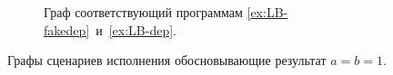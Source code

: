 {\begin{figure}[t]
\begin{subfigure}[b]{.55\textwidth}
  \caption{Граф соответствующий программам 
    \ref{ex:LB-fakedep}~и~\ref{ex:LB-dep}.
  }
  \label{fig:LB-dep-ppo-exec}
  \end{subfigure}

\caption{Графы сценариев исполнения обосновывающие результат $a = b = 1$.}
\label{fig:LB-ppo-execs}
\end{figure}
}

